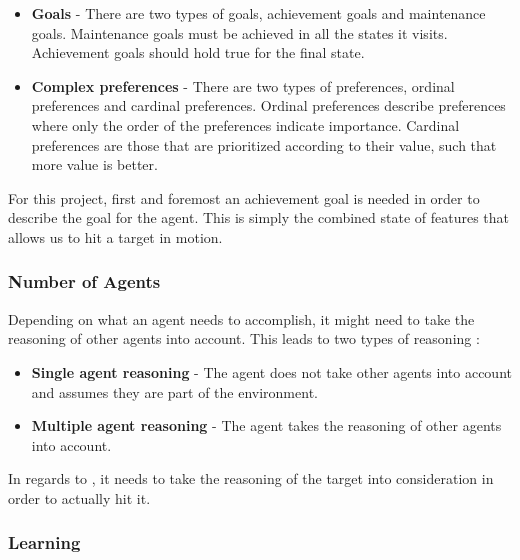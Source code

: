 \begin{itemize}
  \item \textbf{Goals} - There are two types of goals, achievement goals and
  maintenance goals. Maintenance goals must be achieved in all the states it
  visits. Achievement goals should hold true for the final state. 
  \item \textbf{Complex preferences} - There are two types of preferences,
  ordinal preferences and cardinal preferences. Ordinal preferences describe
  preferences where only the order of the preferences indicate importance.
  Cardinal preferences are those that are prioritized according to their value,
  such that more value is better.
\end{itemize}

For this project, first and foremost an achievement goal is needed in order to
describe the goal for the agent. This is simply the combined state of features
that allows us to hit a target in motion. 

\subsubsection{Number of Agents}
Depending on what an agent needs to accomplish, it might need to take the
reasoning of other agents into account. This leads to two types of reasoning
\citep[ch.1.5.6]{MIBook}:
\begin{itemize}
  \item \textbf{Single agent reasoning} - The agent does not take other
  agents into account and assumes they are part of the environment.
  \item \textbf{Multiple agent reasoning} - The agent takes the reasoning of
  other agents into account.
\end{itemize}

In regards to \namep, it needs to take the reasoning of the target into
consideration in order to actually hit it.


\subsubsection{Learning}

